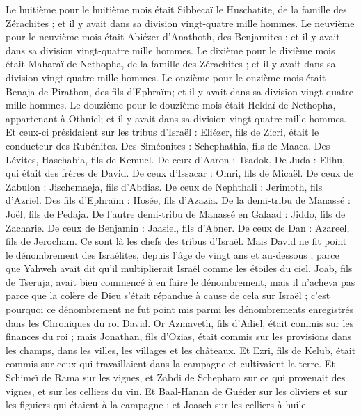 \begin{multicols}{2}
Le huitième pour le huitième mois était Sibbecaï le Huschatite, de la famille des Zérachites ; et il y avait dans sa division vingt-quatre mille hommes.
Le neuvième pour le neuvième mois était Abiézer d'Anathoth, des Benjamites ; et il y avait dans sa division vingt-quatre mille hommes.
Le dixième pour le dixième mois était Maharaï de Nethopha, de la famille des Zérachites ; et il y avait dans sa division vingt-quatre mille hommes.
Le onzième pour le onzième mois était Benaja de Pirathon, des fils d'Ephraïm; et il y avait dans sa division vingt-quatre mille hommes.
Le douzième pour le douzième mois était Heldaï de Nethopha, appartenant à Othniel; et il y avait dans sa division vingt-quatre mille hommes.
Et ceux-ci présidaient sur les tribus d'Israël : Eliézer, fils de Zicri, était le conducteur des Rubénites. Des Siméonites : Schephathia, fils de Maaca.
Des Lévites, Haschabia, fils de Kemuel. De ceux d'Aaron : Tsadok.
De Juda : Elihu, qui était des frères de David. De ceux d'Issacar : Omri, fils de Micaël.
De ceux de Zabulon : Jischemaeja, fils d'Abdias. De ceux de Nephthali : Jerimoth, fils d'Azriel.
Des fils d'Ephraïm : Hosée, fils d'Azazia. De la demi-tribu de Manassé : Joël, fils de Pedaja.
De l'autre demi-tribu de Manassé en Galaad : Jiddo, fils de Zacharie. De ceux de Benjamin : Jaasiel, fils d'Abner.
De ceux de Dan : Azareel, fils de Jerocham. Ce sont là les chefs des tribus d'Israël.
Mais David ne fit point le dénombrement des Israélites, depuis l'âge de vingt ans et au-dessous ; parce que Yahweh avait dit qu'il multiplierait Israël comme les étoiles du ciel.
Joab, fils de Tseruja, avait bien commencé à en faire le dénombrement, mais il n'acheva pas parce que la colère de Dieu s'était répandue à cause de cela sur Israël ; c'est pourquoi ce dénombrement ne fut point mis parmi les dénombrements enregistrés dans les Chroniques du roi David.
Or Azmaveth, fils d'Adiel, était commis sur les finances du roi ; mais Jonathan, fils d'Ozias, était commis sur les provisions dans les champs, dans les villes, les villages et les châteaux.
Et Ezri, fils de Kelub, était commis sur ceux qui travaillaient dans la campagne et cultivaient la terre.
Et Schimeï de Rama sur les vignes, et Zabdi de Schepham sur ce qui provenait des vignes, et sur les celliers du vin.
Et Baal-Hanan de Guéder sur les oliviers et sur les figuiers qui étaient à la campagne ; et Joasch sur les celliers à huile.

\end{multicols}

